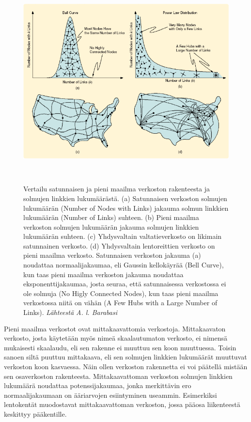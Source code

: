 \documentclass[finnish,12pt,a4paper,pdftex,elec,utf8]{aaltothesis}
\begin{document}
\begin{figure}[htb]
\centering \includegraphics[height=11cm]{Barabasi_1}
\caption{Vertailu satunnaisen ja pieni maailma verkoston rakenteesta ja solmujen linkkien lukumäärästä. (a) Satunnaisen verkoston solmujen lukumäärän (Number of Nodes with Links) jakauma solmun linkkien lukumäärän (Number of Links) suhteen. (b) Pieni maailma verkoston solmujen lukumäärän jakauma solmujen linkkien lukumäärän suhteen. (c) Yhdysvaltain valtatieverkosto on likimain satunnainen verkosto. (d) Yhdysvaltain lentoreittien verkosto on pieni maailma verkosto. Satunnaisen verkoston jakauma (a) noudattaa normaalijakaumaa, eli Gaussin kellokäyrää (Bell Curve), kun taas pieni maailma verkoston jakauma noudattaa eksponenttijakaumaa, josta seuraa, että satunnaisessa verkostossa ei ole solmuja (No Higly Connected Nodes), kun taas pieni maailma verkostossa niitä on vähän (A Few Hubs with a Large Number of Links).  \textit{Lähteestä A. l. Barabasi \cite{The-Architecture}} \label{fig:Barabasi_1}}
\end{figure}

Pieni maailma verkostot ovat mittakaavattomia verkostoja. Mittakaavaton verkosto, josta käytetään myös nimeä skaalautumaton verkosto, ei nimensä mukaisesti skaalaudu, eli sen rakenne ei muuttuu sen koon muuttuessa. Toisin sanoen siltä puuttuu mittakaava, eli sen solmujen linkkien lukumäärät muuttuvat verkoston koon kasvaessa. Näin ollen verkoston rakennetta ei voi päätellä mistään sen osaverkoston rakenteesta. \cite[74--76]{Linkit} Mittakaavattoman verkoston solmujen linkkien lukumäärä noudattaa potenssijakaumaa, jonka merkittävin ero normaalijakaumaan on ääriarvojen esiintyminen useammin. Esimerkiksi lentokentät muodostavat mittakaavattoman verkoston, jossa pääosa liikenteestä keskittyy pääkentille. \cite[74--76]{Linkit}
\end{document}
